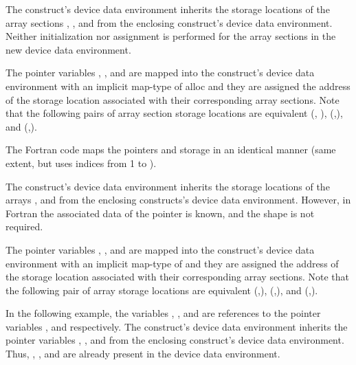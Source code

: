 The  construct's device data environment inherits the storage locations 
of the array sections , , and  from the enclosing 
construct's device data environment. Neither initialization nor assignment is performed 
for the array sections in the new device data environment.

The pointer variables , , and  are mapped into the  construct's device 
data environment with an implicit map-type of alloc and they are assigned the address 
of the storage location associated with their corresponding array sections. Note 
that the following pairs of array section storage locations are equivalent (, 
), (,), and (,).


The Fortran code maps the pointers and storage in an identical manner (same extent, 
but uses indices from 1 to ).

The  construct's device data environment inherits the storage locations 
of the arrays ,  and  from the enclosing  constructs's 
device data environment. However, in Fortran the associated data of the pointer 
is known, and the shape is not required.

The pointer variables , , and  are mapped into the  construct's 
device data environment with an implicit map-type of  and they are 
assigned the address of the storage location associated with their corresponding 
array sections. Note that the following pair of array storage locations are equivalent 
(,), (,), and (,).



In the following example, the variables , , and  are references to the pointer 
variables ,  and  respectively. The  construct's device data 
environment inherits the pointer variables , , and  from the enclosing 
 construct's device data environment. Thus, , , and  are already 
present in the device data environment.


